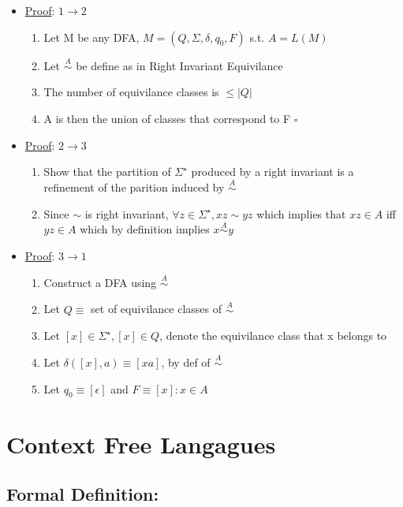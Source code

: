 \documentclass[11pt]{article}
\begin{document}
\begin{itemize}
\item \underline{Proof}: $1\rightarrow 2$

\begin{enumerate}
\item Let M be any DFA, $M=(Q,\Sigma,\delta,q_0,F)$ s.t. $A=L(M)$
\item Let $\stackrel{A}{\sim}$ be define as in Right Invariant Equivilance
\item The number of equivilance classes is $\leq |Q|$
\item A is then the union of classes that correspond to F $\square$
\end{enumerate}

\item \underline{Proof}: $2\rightarrow 3$

\begin{enumerate}
\item Show that the partition of $\Sigma^{\star}$ produced by a right
      invariant is a refinement of the parition induced by $\stackrel{A}{\sim}$
\item Since $\sim$ is right invariant, $\forall z\in
       \Sigma^{\star},xz\sim yz$ which implies that $xz\in A$ iff $yz
       \in A$ which by definition implies $x\stackrel{A}{\sim} y$
\end{enumerate}

\item \underline{Proof}: $3\rightarrow 1$

\begin{enumerate}
\item Construct a DFA using $\stackrel{A}{\sim}$
\item Let $Q \equiv$ set of equivilance classes of $\stackrel{A}{\sim}$
\item Let $[x]\in \Sigma^{\star}, [x]\in Q$, denote the equivilance
       class that x belongs to
\item Let $\delta([x],a)\equiv [xa]$, by def of $\stackrel{A}{\sim}$
\item Let $q_0 \equiv [\epsilon]$ and $F\equiv{[x] : x\in A}$
\end{enumerate}

\end{itemize}
\section{Context Free Langagues}
\label{sec-3}

\subsection{Formal Definition:}
\label{sec-3.1}
\end{document}
